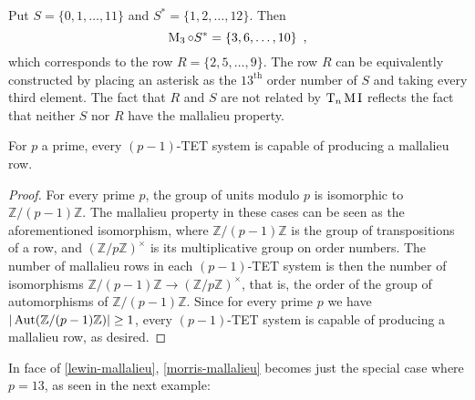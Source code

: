 \begin{example}
	Put $S = \{ 0, 1, \dots, 11 \}$ and $S^* = \{ 1, 2, \dots, 12 \}$. Then
	\begin{equation}
		\operatorname{M}_3 \circ S^* = \{ 3, 6, \dots, 10 \} \enspace,
	\end{equation}
	which corresponds to the row $R = \{ 2, 5, \dots, 9 \}$. The row $R$ can be
	equivalently constructed by placing an asterisk as the $13^\text{th}$ order number of
	$S$ and taking every third element. The fact that $R$ and $S$ are not related by
	$\operatorname{T}_n\operatorname{M}\operatorname{I}$ reflects the fact that neither $S$ nor $R$ have the mallalieu property.
\end{example}

\begin{proposition}
	\label{lewin-mallalieu}
	\cite[285]{Lewin1966}
	For $p$ a prime, every $(p - 1)$-TET system is capable of producing a mallalieu row.
	\begin{proof}
		For every prime $p$, the group of units modulo $p$ is isomorphic to
		$\mathbb{Z} / (p - 1) \mathbb{Z}$. The mallalieu property in these cases can be
		seen as the aforementioned isomorphism, where $\mathbb{Z} / (p - 1) \mathbb{Z}$
		is the group of transpositions of a row, and $(\mathbb{Z} / p \mathbb{Z})^\times$
		is its multiplicative group on order numbers. The number of mallalieu rows in each
		$(p - 1)$-TET system is then the number of isomorphisms
		$\mathbb{Z} / (p - 1) \mathbb{Z} \to (\mathbb{Z} / p \mathbb{Z})^\times$, that is,
		the order of the group of automorphisms of $\mathbb{Z} / (p - 1) \mathbb{Z}$.
		Since for every prime $p$ we have $|\operatorname{Aut}(\mathbb{Z} / (p - 1) \mathbb{Z})| \geq 1$,
		every $(p - 1)$-TET system is capable of producing a mallalieu row, as desired.
	\end{proof}
\end{proposition}

In face of \ref{lewin-mallalieu}, \ref{morris-mallalieu} becomes just the special case
where $p = 13$, as seen in the next example:

